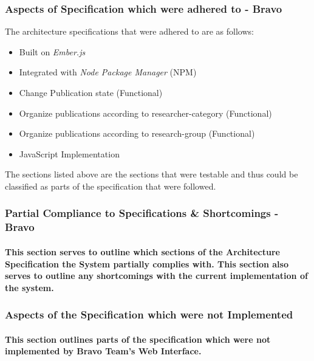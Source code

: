 \documentclass[english]{article}
\begin{document}
\subsubsection{Aspects of Specification which were adhered to - Bravo}
	The architecture specifications that were adhered to are as follows:
	\begin{itemize}
		\item Built on \textit{Ember.js}
		\item Integrated with \textit{Node Package Manager} (NPM)
		\item Change Publication state (Functional)
		\item Organize publications according to researcher-category (Functional)
		\item Organize publications according to research-group (Functional)
		\item JavaScript Implementation
	\end{itemize}
	
	
The sections listed above are the sections that were testable and thus could be classified as parts of the specification that were followed.

\subsubsection{Partial Compliance to Specifications \& Shortcomings - Bravo}
\paragraph{This section serves to outline which sections of the Architecture Specification the System partially complies with. This section also serves to outline any shortcomings with the current implementation of the system.}

\subsubsection{Aspects of the Specification which were not Implemented}
\paragraph{This section outlines parts of the specification which were not implemented by Bravo Team's Web Interface.}
\end{document}
